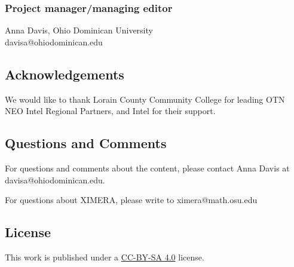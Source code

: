 \documentclass{ximera}
\begin{document}
\subsubsection*{Project manager/managing editor}
Anna Davis, Ohio Dominican University\\
davisa@ohiodominican.edu

\subsection*{Acknowledgements}
We would like to thank Lorain County Community College for leading OTN NEO Intel Regional Partners, and Intel for their support.

\subsection*{Questions and Comments}
For questions and comments about the content, please contact Anna Davis at davisa@ohiodominican.edu.

For questions about XIMERA, please write to ximera@math.osu.edu

\subsection*{License}
This work is published under a \href{https://creativecommons.org/licenses/by-sa/4.0/deed.en}{CC-BY-SA 4.0} license.
\end{document}
